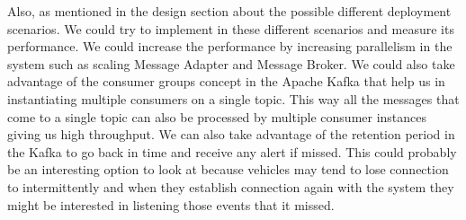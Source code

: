 Also, as mentioned in the design section about the possible different
deployment scenarios. We could try to implement \name in these
different scenarios and measure its performance. We could increase the
performance by increasing parallelism in the system such as scaling
Message Adapter and Message Broker. We could also take advantage of
the consumer groups concept in the Apache Kafka that help us in
instantiating multiple consumers on a single topic. This way all the
messages that come to a single topic can also be processed by multiple
consumer instances giving us high throughput. We can also take
advantage of the retention period in the Kafka to go back in time and
receive any alert if missed. This could probably be an interesting
option to look at because vehicles may tend to lose connection to
intermittently and when they establish connection again with the
system they might be interested in listening those events that it
missed.

